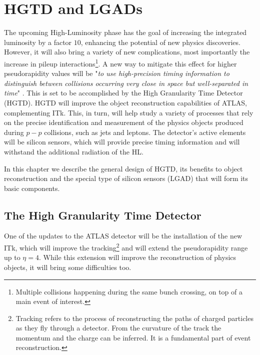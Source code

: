 \chapter{HGTD and LGADs}\label{chap:HGTD_LGADs}


The upcoming High-Luminosity phase has the goal of increasing the integrated luminosity by a factor $10$, enhancing the potential of new physics discoveries. However, it will also bring a variety of new complications, most importantly the increase in pileup interactions\footnote{Multiple collisions happening during the same bunch crossing, on top of a main event of interest.}.
A new way to mitigate this effect for higher pseudorapidity values will be "\textit{to use high-precision timing information to distinguish between collisions occurring very close in space but well-separated in time}" \cite{CERN-LHCC-2020-007}. This is set to be accomplished by the High Granularity Time Detector (HGTD).
HGTD will improve the object reconstruction capabilities of ATLAS, complementing ITk. This, in turn, will help study a variety of processes that rely on the precise identification and measurement of the physics objects produced during $p-p$ collisions, such as jets and leptons.
The detector's active elements will be silicon sensors, which will provide precise timing information and will withstand the additional radiation of the HL.

In this chapter we describe the general design of HGTD, its benefits to object reconstruction and the special type of silicon sensors (LGAD) that will form its basic components.

\section{The High Granularity Time Detector}\label{sec:HGTD}
One of the updates to the ATLAS detector will be the installation of the new ITk, which will improve the tracking\footnote{Tracking refers to the process of reconstructing the paths of charged particles as they fly through a detector. From the curvature of the track the momentum and the charge can be inferred. It is a fundamental part of event reconstruction.} and will extend the pseudorapidity range up to $\eta=4$. While this extension will improve the reconstruction of physics objects, it will bring some difficulties too.

